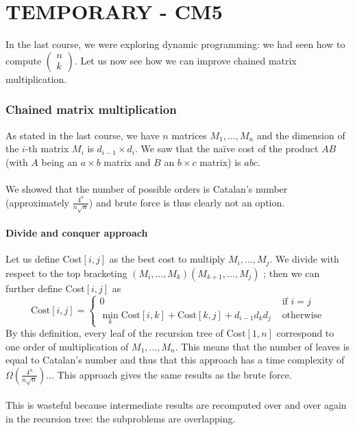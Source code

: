\part*{TEMPORARY - CM5}

In the last course, we were exploring dynamic programming: we had seen how to compute $\begin{pmatrix}
n \\
k
\end{pmatrix}$. Let us now see how we can improve chained matrix multiplication. 

\section{Chained matrix multiplication}

As stated in the last course, we have $n$ matrices $M_1,..., M_n$ and the dimension of the $i$-th matrix $M_i$ is $d_{i-1} \times d_i$. We saw that the naïve cost of the product $AB$ (with $A$ being an $a \times b$ matrix and $B$ an $b \times c$ matrix) is $abc$. 
\\ \\
We showed that the number of possible orders is Catalan's number (approximately $\frac{4^n}{n\sqrt{n}}$) and brute force is thus clearly not an option.

\subsection{Divide and conquer approach} 

Let us define Cost$[i,j]$ as the best cost to multiply $M_i,...,M_j$. We divide with respect to the top bracketing $(M_i,...,M_k)(M_{k+1},...,M_j)$ ; then we can further define Cost$[i,j]$ as 
\begin{equation}
 \text{Cost}[i,j] = \begin{cases} 
 	0 & \text{ if } i=j \\
 	\min_k \text{Cost}[i,k] + \text{Cost}[k,j] + d_{i-1}d_kd_j & \text{ otherwise}
 \end{cases}
 \label{eq1}
\end{equation}
By this definition, every leaf of the recursion tree of Cost$[1,n]$ correspond to one order of multiplication of $M_1,...,M_n$. This means that the number of leaves is equal to Catalan's number and thus that this approach has a time complexity of $\Omega  (\frac{4^n}{n\sqrt{n}})$... This approach gives the same results as the brute force. 
\\ \\
This is wasteful because intermediate results are recomputed over and over again in the recursion tree: the subproblems are overlapping.

